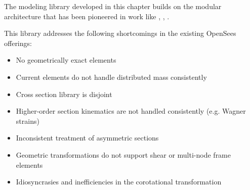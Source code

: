 The modeling library developed in this chapter builds on the modular architecture that has been pioneered in work like \cite{filippou1996fedeas}, \cite{desouza2000forcebased}, \cite{scott2008softwarea}. 


This library addresses the following shortcomings in the existing
OpenSees offerings:

\begin{itemize}
\tightlist
\item
  No geometrically exact elements
\item
  Current elements do not handle distributed mass consistently
\item
  Cross section library is disjoint
\item
  Higher-order section kinematics are not handled consistently (e.g.
  Wagner strains)
\item
  Inconsistent treatment of asymmetric sections
\item
  Geometric transformations do not support shear or multi-node frame
  elements
\item
  Idiosyncrasies and inefficiencies in the corotational transformation
\end{itemize}